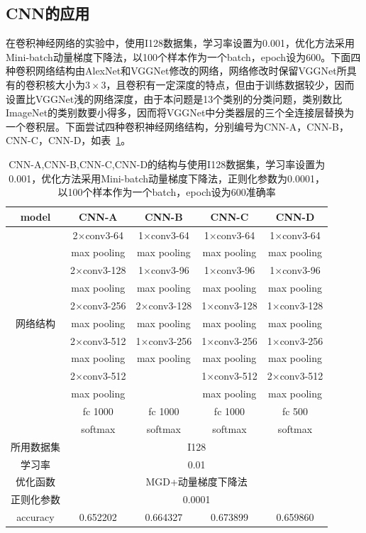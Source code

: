 \subsection{CNN的应用}
在卷积神经网络的实验中，使用I128数据集，学习率设置为0.001，优化方法采用Mini-batch动量梯度下降法，以100个样本作为一个batch，epoch设为600。下面四种卷积网络结构由AlexNet和VGGNet修改的网络，网络修改时保留VGGNet所具有的卷积核大小为$3\times3$，且卷积有一定深度的特点，但由于训练数据较少，因而设置比VGGNet浅的网络深度，由于本问题是13个类别的分类问题，类别数比ImageNet的类别数要小得多，因而将VGGNet中分类器层的三个全连接层替换为一个卷积层。下面尝试四种卷积神经网络结构，分别编号为CNN-A，CNN-B，CNN-C，CNN-D，如表~\ref{fig:cnn7}。

\begin{table}[htb]
\centering
\caption{CNN-A,CNN-B,CNN-C,CNN-D的结构与使用I128数据集，学习率设置为0.001，优化方法采用Mini-batch动量梯度下降法，正则化参数为0.0001，以100个样本作为一个batch，epoch设为600准确率}
\begin{tabular}{ccccc}
\toprule[2pt]
model  & CNN-A & CNN-B & CNN-C & CNN-D \\ 
\midrule[1pt]
\ & 2$\times$conv3-64 & 1$\times$conv3-64 & 1$\times$conv3-64 & 1$\times$conv3-64 \\ 
\ & max pooling & max pooling & max pooling & max pooling \\ 
\ & 2$\times$conv3-128 & 1$\times$conv3-96 & 1$\times$conv3-96 & 1$\times$conv3-96 \\ 
\ & max pooling & max pooling & max pooling & max pooling \\ 
\ & 2$\times$conv3-256 & 2$\times$conv3-128 & 1$\times$conv3-128 & 1$\times$conv3-128 \\  
网络结构 & max pooling & max pooling & max pooling & max pooling \\  
\ & 2$\times$conv3-512 & 1$\times$conv3-256 & 1$\times$conv3-256 & 1$\times$conv3-256 \\ 
\ & max pooling & max pooling & max pooling & max pooling \\ 
\ & 2$\times$conv3-512 & \ & 1$\times$conv3-512 & 2$\times$conv3-512 \\ 
\ & max pooling & \ & max pooling & max pooling \\
\ & fc 1000 & fc 1000 & fc 1000 & fc 500 \\ 
\ & softmax & softmax & softmax & softmax \\ 
\midrule[1pt]
所用数据集 & \multicolumn{4}{c}{I128}\\
学习率 & \multicolumn{4}{c}{0.01}\\
优化函数  & \multicolumn{4}{c}{MGD+动量梯度下降法}\\
正则化参数 & \multicolumn{4}{c}{0.0001}\\
\midrule[1pt]
accuracy & 0.652202 & 0.664327 & 0.673899 & 0.659860 \\ 
\bottomrule[2pt]
\end{tabular} 
\label{fig:cnn7}
\end{table}

